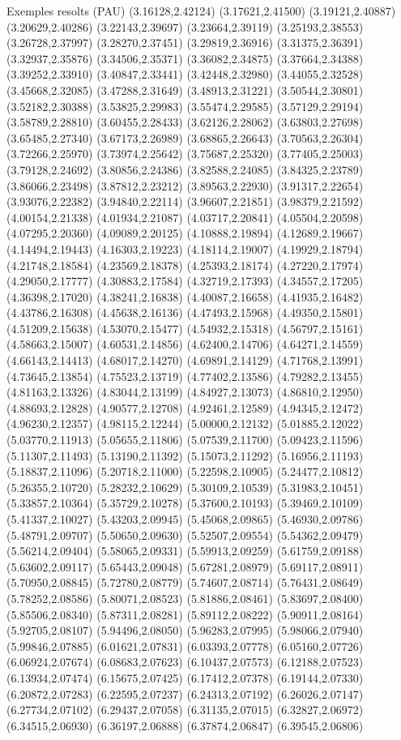 \documentclass[11pt,a4paper]{article}
\begin{document}
\begin{fmex}{Exemples resolts (PAU)}
(3.16128,2.42124) (3.17621,2.41500) (3.19121,2.40887) (3.20629,2.40286) (3.22143,2.39697) (3.23664,2.39119) (3.25193,2.38553) (3.26728,2.37997) (3.28270,2.37451) (3.29819,2.36916) (3.31375,2.36391) (3.32937,2.35876) (3.34506,2.35371) (3.36082,2.34875) (3.37664,2.34388) (3.39252,2.33910) (3.40847,2.33441) (3.42448,2.32980) (3.44055,2.32528) (3.45668,2.32085) (3.47288,2.31649) (3.48913,2.31221) (3.50544,2.30801) (3.52182,2.30388) (3.53825,2.29983) (3.55474,2.29585) (3.57129,2.29194) (3.58789,2.28810) (3.60455,2.28433) (3.62126,2.28062) (3.63803,2.27698) (3.65485,2.27340) (3.67173,2.26989) (3.68865,2.26643) (3.70563,2.26304) (3.72266,2.25970) (3.73974,2.25642) (3.75687,2.25320) (3.77405,2.25003) (3.79128,2.24692) (3.80856,2.24386) (3.82588,2.24085) (3.84325,2.23789) (3.86066,2.23498) (3.87812,2.23212) (3.89563,2.22930) (3.91317,2.22654) (3.93076,2.22382) (3.94840,2.22114) (3.96607,2.21851) (3.98379,2.21592) (4.00154,2.21338) (4.01934,2.21087) (4.03717,2.20841) (4.05504,2.20598) (4.07295,2.20360) (4.09089,2.20125) (4.10888,2.19894) (4.12689,2.19667) (4.14494,2.19443) (4.16303,2.19223) (4.18114,2.19007) (4.19929,2.18794) (4.21748,2.18584) (4.23569,2.18378) (4.25393,2.18174) (4.27220,2.17974) (4.29050,2.17777) (4.30883,2.17584) (4.32719,2.17393) (4.34557,2.17205) (4.36398,2.17020) (4.38241,2.16838) (4.40087,2.16658) (4.41935,2.16482) (4.43786,2.16308) (4.45638,2.16136) (4.47493,2.15968) (4.49350,2.15801) (4.51209,2.15638) (4.53070,2.15477) (4.54932,2.15318) (4.56797,2.15161) (4.58663,2.15007) (4.60531,2.14856) (4.62400,2.14706) (4.64271,2.14559) (4.66143,2.14413) (4.68017,2.14270) (4.69891,2.14129) (4.71768,2.13991) (4.73645,2.13854) (4.75523,2.13719) (4.77402,2.13586) (4.79282,2.13455) (4.81163,2.13326) (4.83044,2.13199) (4.84927,2.13073) (4.86810,2.12950) (4.88693,2.12828) (4.90577,2.12708) (4.92461,2.12589) (4.94345,2.12472) (4.96230,2.12357) (4.98115,2.12244) (5.00000,2.12132) (5.01885,2.12022) (5.03770,2.11913) (5.05655,2.11806) (5.07539,2.11700) (5.09423,2.11596) (5.11307,2.11493) (5.13190,2.11392) (5.15073,2.11292) (5.16956,2.11193) (5.18837,2.11096) (5.20718,2.11000) (5.22598,2.10905) (5.24477,2.10812) (5.26355,2.10720) (5.28232,2.10629) (5.30109,2.10539) (5.31983,2.10451) (5.33857,2.10364) (5.35729,2.10278) (5.37600,2.10193) (5.39469,2.10109) (5.41337,2.10027) (5.43203,2.09945) (5.45068,2.09865) (5.46930,2.09786) (5.48791,2.09707) (5.50650,2.09630) (5.52507,2.09554) (5.54362,2.09479) (5.56214,2.09404) (5.58065,2.09331) (5.59913,2.09259) (5.61759,2.09188) (5.63602,2.09117) (5.65443,2.09048) (5.67281,2.08979) (5.69117,2.08911) (5.70950,2.08845) (5.72780,2.08779) (5.74607,2.08714) (5.76431,2.08649) (5.78252,2.08586) (5.80071,2.08523) (5.81886,2.08461) (5.83697,2.08400) (5.85506,2.08340) (5.87311,2.08281) (5.89112,2.08222) (5.90911,2.08164) (5.92705,2.08107) (5.94496,2.08050) (5.96283,2.07995) (5.98066,2.07940) (5.99846,2.07885) (6.01621,2.07831) (6.03393,2.07778) (6.05160,2.07726) (6.06924,2.07674) (6.08683,2.07623) (6.10437,2.07573) (6.12188,2.07523) (6.13934,2.07474) (6.15675,2.07425) (6.17412,2.07378) (6.19144,2.07330) (6.20872,2.07283) (6.22595,2.07237) (6.24313,2.07192) (6.26026,2.07147) (6.27734,2.07102) (6.29437,2.07058) (6.31135,2.07015) (6.32827,2.06972) (6.34515,2.06930) (6.36197,2.06888) (6.37874,2.06847) (6.39545,2.06806) 
\end{fmex}
\end{document}

